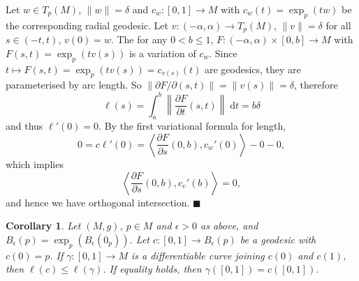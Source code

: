 \documentclass[letter-paper]{tufte-book}
\newtheorem{corollary}[theorem]{\color{pastel-blue}Corollary}
\newenvironment{proof}[1][Proof]{\begin{trivlist}
\item[\hskip \labelsep {\bfseries #1}]}{\end{trivlist}}
\newcommand{\qed}{\hfill$\blacksquare$}
\begin{document}
\begin{proof}
  Let $w\in T_p(M)$, $\|w\| = \delta$ and $c_w: [0,1]\to M$ with $c_w(t) = \exp_p (tw)$ be the corresponding radial geodesic. Let $v:(-\alpha, \alpha) \to T_p(M)$, $\|v\|=\delta$ for all $s \in (-t, t)$, $v(0) = w$. The for any $0 < b \leq 1$, $F:(-\alpha, \alpha) \times [0, b] \to M$ with $F(s,t) = \exp_p(t v(s))$ is a variation of $c_w$. Since $t\mapsto F(s,t) = \exp_p (t v(s)) = c_{v(s)}(t)$ are geodesics, they are parameterised by arc length. So $\|\partial F/\partial (s,t)\| = \|v(s)\| = \delta$, therefore
  \begin{equation*}
    \ell(s) = \int_a^b \left\| \frac{\partial F}{\partial t}(s,t)\right\|\; \mathrm{d}t = b\delta
  \end{equation*}
  and thus $\ell'(0) = 0$. By the first variational formula for length,
  \begin{equation*}
    0 = c\ell'(0) = \left\langle \frac{\partial F}{\partial s}(0,b), c_w'(0) \right\rangle - 0 - 0,
  \end{equation*}
  which implies
  \begin{equation*}
    \left\langle \frac{\partial F}{\partial s}(0,b), c_v'(b) \right\rangle = 0,
  \end{equation*}
  and hence we have orthogonal intersection. \qed
\end{proof}

\begin{corollary}
  Let $(M,g)$, $p\in M$ and $\epsilon > 0$ as above, and $B_\epsilon(p) = \exp_p(B_\epsilon(0_p))$. Let $c:[0,1] \to B_\epsilon(p)$ be a geodesic with $c(0) = p$. If $\gamma:[0,1] \to M$ is a differentiable curve joining $c(0)$ and $c(1)$, then $\ell(c) \leq \ell(\gamma)$. If equality holds, then $\gamma([0,1]) = c([0,1])$.
\end{corollary}
\end{document}
